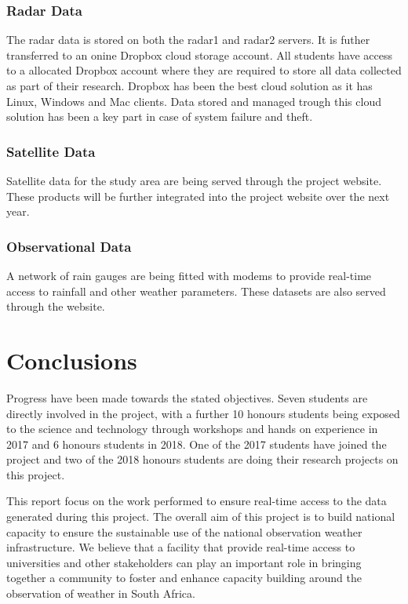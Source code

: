 \documentclass{wrcreport}
\begin{document}
\subsection{Radar Data}

The radar data is stored on both the radar1 and
radar2 servers. It is futher transferred to an onine Dropbox cloud
storage account. All students have access to a allocated Dropbox
account where they are required to store all data collected as part of
their research. Dropbox has been the best cloud solution as it has
Linux, Windows and Mac clients. Data stored and managed trough this
cloud solution has been a key part in case of system failure and
theft.

\subsection{Satellite Data}

Satellite data for the study area are being
served through the project website. These products will be further
integrated into the project website over the next year.

\subsection{Observational Data}

A network of rain gauges are being fitted with modems to provide
real-time access to rainfall and other weather parameters. These
datasets are also served through the website.

\chapter{Conclusions}

Progress have been made towards the stated objectives. Seven students
are directly involved in the project, with a further 10 honours
students being exposed to the science and technology through workshops
and hands on experience in 2017 and 6 honours students in 2018. One of
the 2017 students have joined the project and two of the 2018 honours
students are doing their research projects on this project.

This report focus on the work performed to ensure real-time access to
the data generated during this project. The overall aim of this
project is to build national capacity to ensure the sustainable use of
the national observation weather infrastructure. We believe that a
facility that provide real-time access to universities and other
stakeholders can play an important role in bringing together a
community to foster and enhance capacity building around the
observation of weather in South Africa.
\end{document}
